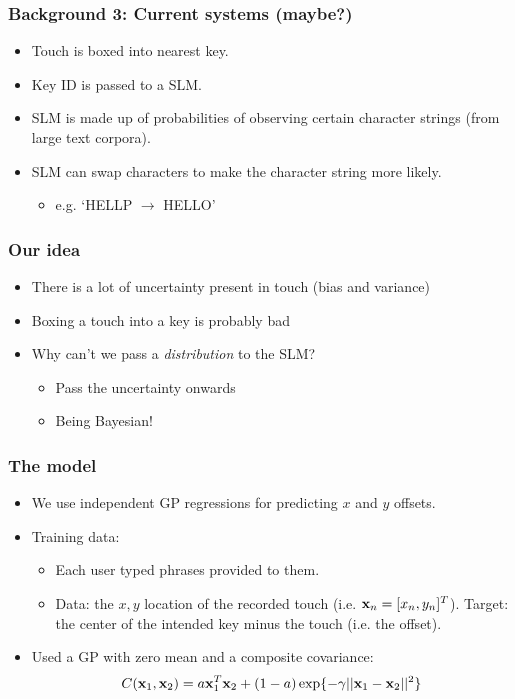 \begin{frame}
	\frametitle{Background 3: Current systems (maybe?)}
	\begin{itemize}
		\item Touch is boxed into nearest key.
		\item Key ID is passed to a \ac{SLM}.
		\item \ac{SLM} is made up of probabilities of observing certain character strings (from large text corpora).
		\item \ac{SLM} can swap characters to make the character string more likely.
		\begin{itemize}
			\item e.g. `HELLP $\rightarrow$ HELLO'
		\end{itemize}
	\end{itemize}
\end{frame}


\begin{frame}
	\frametitle{Our idea}
	\begin{itemize}
		\item There is a lot of uncertainty present in touch (bias and variance)
		\item Boxing a touch into a key is probably bad
		\item Why can't we pass a \emph{distribution} to the \ac{SLM}?
		\begin{itemize}
			\item Pass the uncertainty onwards
			\item Being Bayesian!
		\end{itemize}
	\end{itemize}
\end{frame}

\begin{frame}
	\frametitle{The model}
	\begin{itemize}
		\item We use independent GP regressions for predicting $x$ and $y$ offsets.
		\item Training data:
		\begin{itemize}
			\item Each user typed phrases provided to them.
			\item Data: the $x,y$ location of the recorded touch (i.e. $\mathbf{x}_n = [x_n,y_n]^T$). Target: the center of the intended key minus the touch (i.e. the offset).
		\end{itemize}
		\item<2-> Used a \ac{GP} with zero mean and a composite covariance:
		\[
			C(\mathbf{x}_1,\mathbf{x}_2) = a \mathbf{x}_1^T\mathbf{x}_2 + (1-a)\exp \{ -\gamma || \mathbf{x}_1 - \mathbf{x}_2 ||^2 \}
		\]
	\end{itemize}
\end{frame}

